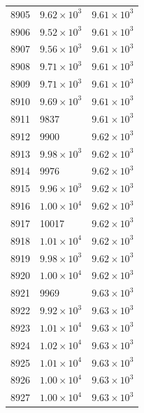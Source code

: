 \begin{table}[H]
\begin{tabular}{lll}
8905 & $\displaystyle 9.62 \times 10^{3}$ & $\displaystyle 9.61 \times 10^{3}$ \\
8906 & $\displaystyle 9.52 \times 10^{3}$ & $\displaystyle 9.61 \times 10^{3}$ \\
8907 & $\displaystyle 9.56 \times 10^{3}$ & $\displaystyle 9.61 \times 10^{3}$ \\
8908 & $\displaystyle 9.71 \times 10^{3}$ & $\displaystyle 9.61 \times 10^{3}$ \\
8909 & $\displaystyle 9.71 \times 10^{3}$ & $\displaystyle 9.61 \times 10^{3}$ \\
8910 & $\displaystyle 9.69 \times 10^{3}$ & $\displaystyle 9.61 \times 10^{3}$ \\
8911 & 9837 & $\displaystyle 9.61 \times 10^{3}$ \\
8912 & 9900 & $\displaystyle 9.62 \times 10^{3}$ \\
8913 & $\displaystyle 9.98 \times 10^{3}$ & $\displaystyle 9.62 \times 10^{3}$ \\
8914 & 9976 & $\displaystyle 9.62 \times 10^{3}$ \\
8915 & $\displaystyle 9.96 \times 10^{3}$ & $\displaystyle 9.62 \times 10^{3}$ \\
8916 & $\displaystyle 1.00 \times 10^{4}$ & $\displaystyle 9.62 \times 10^{3}$ \\
8917 & 10017 & $\displaystyle 9.62 \times 10^{3}$ \\
8918 & $\displaystyle 1.01 \times 10^{4}$ & $\displaystyle 9.62 \times 10^{3}$ \\
8919 & $\displaystyle 9.98 \times 10^{3}$ & $\displaystyle 9.62 \times 10^{3}$ \\
8920 & $\displaystyle 1.00 \times 10^{4}$ & $\displaystyle 9.62 \times 10^{3}$ \\
8921 & 9969 & $\displaystyle 9.63 \times 10^{3}$ \\
8922 & $\displaystyle 9.92 \times 10^{3}$ & $\displaystyle 9.63 \times 10^{3}$ \\
8923 & $\displaystyle 1.01 \times 10^{4}$ & $\displaystyle 9.63 \times 10^{3}$ \\
8924 & $\displaystyle 1.02 \times 10^{4}$ & $\displaystyle 9.63 \times 10^{3}$ \\
8925 & $\displaystyle 1.01 \times 10^{4}$ & $\displaystyle 9.63 \times 10^{3}$ \\
8926 & $\displaystyle 1.00 \times 10^{4}$ & $\displaystyle 9.63 \times 10^{3}$ \\
8927 & $\displaystyle 1.00 \times 10^{4}$ & $\displaystyle 9.63 \times 10^{3}$ \\

\end{tabular}
\end{table}
